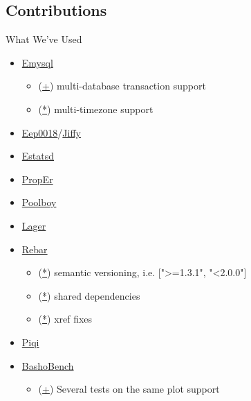 \documentclass[aspectratio=169]{beamer}
\begin{document}
\subsection{Contributions}
\begin{frame}{What We've Used}
    \begin{itemize}
        \item \href{https://github.com/Eonblast/Emysql}{Emysql}
            \begin{itemize}
                \item
                    (\href{https://github.com/Eonblast/Emysql/commit/df25362f9cde560de680c76780d540afd43109f3}{+}) multi-database transaction support
                \item (\href{https://github.com/Eonblast/Emysql/pull/43}{*}) multi-timezone support
            \end{itemize}
        \item \href{http://github.com/davisp/eep0018}{Eep0018}/\href{http://github.com/davisp/jiffy}{Jiffy}
        \item \href{http://github.com/RJ/estatsd}{Estatsd}
        \item \href{http://github.com/manopapad/proper}{PropEr}
        \item \href{http://github.com/devinus/poolboy}{Poolboy}
        \item \href{http://github.com/basho/lager}{Lager}
        \item \href{http://github.com/basho/rebar}{Rebar}
            \begin{itemize}
                \item (\href{https://github.com/basho/rebar/pull/263}{*}) semantic versioning, i.e. [">=1.3.1", "<2.0.0"]
                \item (\href{https://github.com/basho/rebar/pull/262}{*}) shared dependencies
                \item (\href{https://github.com/rebar/rebar/pull/65}{*}) xref fixes
            \end{itemize}
        \item \href{http://github.com/alavrik/piqi}{Piqi}
        \item \href{http://github.com/basho/basho\_bench}{BashoBench}
            \begin{itemize}
                \item (\href{https://github.com/basho/basho\_bench/pull/67}{+}) Several tests on the same plot support
            \end{itemize}
    \end{itemize}
\end{frame}
\end{document}
